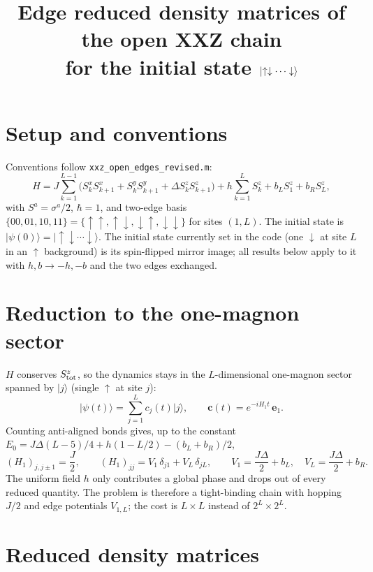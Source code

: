 \documentclass[11pt]{article}
\title{Edge reduced density matrices of the open XXZ chain\\ for the initial state $\ket{\up\dn\cdots\dn}$}
\author{}
\date{}
\newcommand{\ket}[1]{\lvert #1\rangle}
\newcommand{\up}{\uparrow}
\newcommand{\dn}{\downarrow}
\begin{document}
\maketitle

\section{Setup and conventions}

Conventions follow \texttt{xxz\_open\_edges\_revised.m}:
\begin{equation}
H = J\sum_{k=1}^{L-1}\bigl(S^x_kS^x_{k+1}+S^y_kS^y_{k+1}+\Delta S^z_kS^z_{k+1}\bigr)
 + h\sum_{k=1}^{L}S^z_k + b_L S^z_1 + b_R S^z_L ,
\end{equation}
with $S^a=\sigma^a/2$, $\hbar=1$, and two-edge basis $\{00,01,10,11\}=\{\up\up,\up\dn,\dn\up,\dn\dn\}$ for sites $(1,L)$.
The initial state is $\ket{\psi(0)}=\ket{\up\dn\cdots\dn}$.
The initial state currently set in the code (one $\dn$ at site $L$ in an $\up$ background) is its spin-flipped mirror image; all results below apply to it with $h,b\to-h,-b$ and the two edges exchanged.

\section{Reduction to the one-magnon sector}

$H$ conserves $S^z_{\rm tot}$, so the dynamics stays in the $L$-dimensional one-magnon sector spanned by $\ket{j}$ (single $\up$ at site $j$):
\begin{equation}
\ket{\psi(t)}=\sum_{j=1}^{L}c_j(t)\ket{j},\qquad \bm c(t)=e^{-iH_1t}\,\bm e_1 .
\end{equation}
Counting anti-aligned bonds gives, up to the constant $E_0=J\Delta(L-5)/4+h(1-L/2)-(b_L+b_R)/2$,
\begin{equation}
(H_1)_{j,j\pm1}=\frac J2,\qquad (H_1)_{jj}=V_1\,\delta_{j1}+V_L\,\delta_{jL},\qquad
V_1=\frac{J\Delta}{2}+b_L,\quad V_L=\frac{J\Delta}{2}+b_R .
\end{equation}
The uniform field $h$ only contributes a global phase and drops out of every reduced quantity.
The problem is therefore a tight-binding chain with hopping $J/2$ and edge potentials $V_{1,L}$; the cost is $L\times L$ instead of $2^L\times2^L$.

\section{Reduced density matrices}
\end{document}
